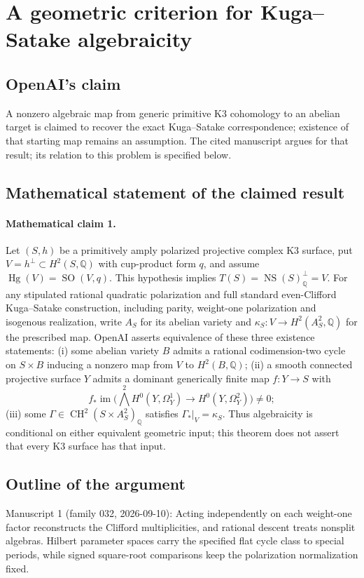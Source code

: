 \documentclass[11pt]{article}
\begin{document}
\section*{A geometric criterion for Kuga–Satake algebraicity}

\subsection{OpenAI's claim}
A nonzero algebraic map from generic primitive K3 cohomology to an abelian target is claimed to recover the exact Kuga--Satake correspondence; existence of that starting map remains an assumption. The cited manuscript argues for that result; its relation to this problem is specified below.

\subsection{Mathematical statement of the claimed result}
\paragraph{Mathematical claim 1.} Let $(S,h)$ be a primitively amply polarized projective complex K3 surface, put $V=h^\perp\subset H^2(S,\mathbb Q)$ with cup-product form $q$, and assume $\operatorname{Hg}(V)=\operatorname{SO}(V,q)$. This hypothesis implies $T(S)=\operatorname{NS}(S)_{\mathbb Q}^{\perp}=V$. For any stipulated rational quadratic polarization and full standard even-Clifford Kuga--Satake construction, including parity, weight-one polarization and isogenous realization, write $A_S$ for its abelian variety and $\kappa_S:V\to H^2(A_S^2,\mathbb Q)$ for the prescribed map. OpenAI asserts equivalence of these three existence statements: (i) some abelian variety $B$ admits a rational codimension-two cycle on $S\times B$ inducing a nonzero map from $V$ to $H^2(B,\mathbb Q)$; (ii) a smooth connected projective surface $Y$ admits a dominant generically finite map $f:Y\to S$ with
\[
f_*\operatorname{im}\bigl(\bigwedge^2 H^0(Y,\Omega_Y^1)\longrightarrow H^0(Y,\Omega_Y^2)\bigr)\ne0;
\]
(iii) some $\Gamma\in\operatorname{CH}^2(S\times A_S^2)_{\mathbb Q}$ satisfies $\Gamma_*|_V=\kappa_S$. Thus algebraicity is conditional on either equivalent geometric input; this theorem does not assert that every K3 surface has that input.

\subsection{Outline of the argument}
Manuscript 1 (family 032, 2026-09-10): Acting independently on each weight-one factor reconstructs the Clifford multiplicities, and rational descent treats nonsplit algebras. Hilbert parameter spaces carry the specified flat cycle class to special periods, while signed square-root comparisons keep the polarization normalization fixed.
\end{document}
